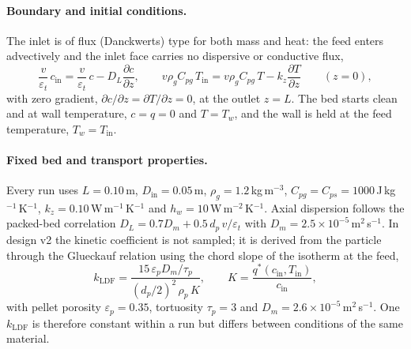 \paragraph{Boundary and initial conditions.} The inlet is of flux (Danckwerts) type for
both mass and heat: the feed enters advectively and the inlet face carries no
dispersive or conductive flux,
\begin{equation}
\frac{v}{\varepsilon_t}\,c_{\mathrm{in}} = \frac{v}{\varepsilon_t}\,c - D_L\frac{\partial c}{\partial z},
\qquad
v\rho_g C_{pg}\,T_{\mathrm{in}} = v\rho_g C_{pg}\,T - k_z\frac{\partial T}{\partial z}
\qquad (z = 0),
\label{eq:danckwerts}
\end{equation}
with zero gradient, \(\partial c/\partial z = \partial T/\partial z = 0\), at the outlet
\(z = L\). The bed starts clean and at wall temperature, \(c = q = 0\) and \(T = T_w\),
and the wall is held at the feed temperature, \(T_w = T_{\mathrm{in}}\).

\paragraph{Fixed bed and transport properties.}
Every run uses \(L = 0.10\)\,m, \(D_{\mathrm{in}} = 0.05\)\,m,
\(\rho_g = 1.2\)\,kg\,m\(^{-3}\), \(C_{pg} = C_{ps} = 1000\)\,J\,kg\(^{-1}\)\,K\(^{-1}\),
\(k_z = 0.10\)\,W\,m\(^{-1}\)\,K\(^{-1}\) and \(h_w = 10\)\,W\,m\(^{-2}\)\,K\(^{-1}\). Axial
dispersion follows the packed-bed correlation \(D_L = 0.7D_m + 0.5\,d_p\,v/\varepsilon_t\)
with \(D_m = 2.5\times10^{-5}\)\,m\(^2\)\,s\(^{-1}\).
In design v2 the kinetic coefficient is not sampled; it is derived from the particle
through the Glueckauf relation using the chord slope of the isotherm at the feed,
\begin{equation}
k_{\mathrm{LDF}} = \frac{15\,\varepsilon_p D_m/\tau_p}{(d_p/2)^2\,\rho_p\,K},
\qquad K = \frac{q^{*}(c_{\mathrm{in}},T_{\mathrm{in}})}{c_{\mathrm{in}}},
\label{eq:glueckauf}
\end{equation}
with pellet porosity \(\varepsilon_p = 0.35\), tortuosity \(\tau_p = 3\) and
\(D_m = 2.6\times10^{-5}\)\,m\(^2\)\,s\(^{-1}\). One \(k_{\mathrm{LDF}}\) is therefore
constant within a run but differs between conditions of the same material.

